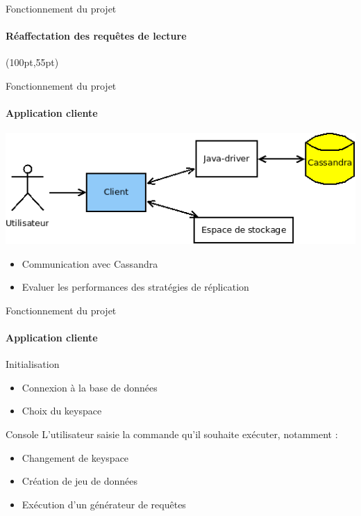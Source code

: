 \documentclass{beamer}
\begin{document}
\begin{frame}{Fonctionnement du projet}
\framesubtitle{Réaffectation des requêtes de lecture}
\begin{textblock*}{\paperwidth}(100pt,55pt)
\end{textblock*}
\end{frame}


\begin{frame}{Fonctionnement du projet}
 \framesubtitle{Application cliente}
 \centering
   \includegraphics[scale=0.40]{acteurs}
  
  \begin{itemize}
   \item Communication avec Cassandra
   \item Evaluer les performances des stratégies de réplication
  \end{itemize}

\end{frame}

\begin{frame}{Fonctionnement du projet}
\framesubtitle{Application cliente}
  \begin{block}{Initialisation}
    \begin{itemize}
    \item Connexion à la base de données
    \item Choix du keyspace
    \end{itemize}
  \end{block}

  \begin{block}{Console}
  L'utilisateur saisie la commande qu'il souhaite exécuter, notamment :
    \begin{itemize}
    \item Changement de keyspace
    \item Création de jeu de données
    \item Exécution d'un générateur de requêtes
    \end{itemize}
  \end{block}
\end{frame}
\end{document}
